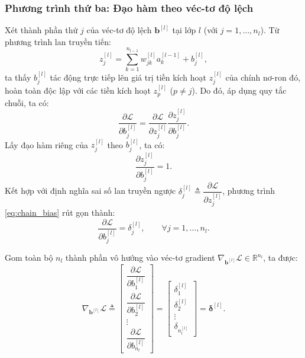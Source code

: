 \subsubsection{Phương trình thứ ba: Đạo hàm theo véc-tơ độ lệch}
Xét thành phần thứ $j$ của véc-tơ độ lệch $\mathbf{b}^{[l]}$ tại lớp $l$ (với $j = 1, \dots, n_l$). Từ phương trình lan truyền tiến:
\begin{equation}
z_j^{[l]} = \sum_{k=1}^{n_{l-1}} w_{jk}^{[l]}a_k^{[l-1]} + b_j^{[l]},
\end{equation}
ta thấy $b_j^{[l]}$ tác động trực tiếp lên giá trị tiền kích hoạt $z_j^{[l]}$ của chính nơ-ron đó, hoàn toàn độc lập với các tiền kích hoạt $z_p^{[l]}$ ($p \neq j$). Do đó, áp dụng quy tắc chuỗi, ta có:
\begin{equation}
\frac{\partial\mathcal{L}}{\partial b_j^{[l]}} = \frac{\partial\mathcal{L}}{\partial z_j^{[l]}} \frac{\partial z_j^{[l]}}{\partial b_j^{[l]}}.
\label{eq:chain_bias}
\end{equation}
Lấy đạo hàm riêng của $z_j^{[l]}$ theo $b_j^{[l]}$, ta có:
\begin{equation}
\frac{\partial z_j^{[l]}}{\partial b_j^{[l]}} = 1.
\end{equation}
Kết hợp với định nghĩa sai số lan truyền ngược $\delta_j^{[l]} \triangleq \dfrac{\partial\mathcal{L}}{\partial z_j^{[l]}}$, phương trình \eqref{eq:chain_bias} rút gọn thành:
\begin{equation}
\frac{\partial\mathcal{L}}{\partial b_j^{[l]}} = \delta_j^{[l]}, \qquad \forall j = 1, \dots, n_l.
\label{eq:bp_bias_component}
\end{equation}

Gom toàn bộ $n_l$ thành phần vô hướng vào véc-tơ gradient $\nabla_{\mathbf{b}^{[l]}}\mathcal{L} \in \mathbb{R}^{n_l}$, ta được:
\begin{equation}
\nabla_{\mathbf{b}^{[l]}}\mathcal{L} \triangleq 
\begin{bmatrix} 
\dfrac{\partial\mathcal{L}}{\partial b_1^{[l]}} \\[8pt] 
\dfrac{\partial\mathcal{L}}{\partial b_2^{[l]}} \\[8pt] 
\vdots \\ 
\dfrac{\partial\mathcal{L}}{\partial b_{n_l}^{[l]}} 
\end{bmatrix} 
= 
\begin{bmatrix} 
\delta_1^{[l]} \\[8pt] 
\delta_2^{[l]} \\[8pt] 
\vdots \\ 
\delta_{n_l^{[l]}} 
\end{bmatrix} 
= \boldsymbol{\delta}^{[l]}.
\end{equation}


